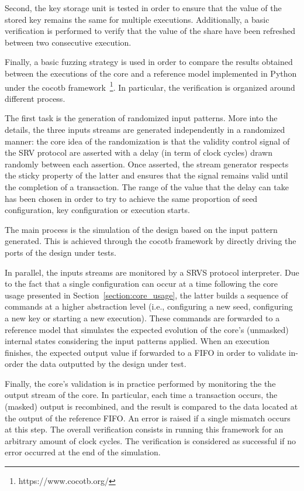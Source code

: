 \documentclass{scrartcl}
\begin{document}
Second, the key storage unit is tested in order to ensure that the value of the
stored key remains the same for multiple executions. Additionally, a basic
verification is performed to verify that the value of the share have been
refreshed between two consecutive execution. 

Finally, a basic fuzzing strategy is used in order to compare the results
obtained between the executions of the core and a reference model implemented in
Python under the cocotb framework~\footnote{https://www.cocotb.org/}.
In particular, the verification is organized around different process.  

The first task is the generation of randomized input patterns. More into the
details, the three inputs streams are generated independently in a randomized
manner: the core idea of the randomization is that the validity control signal
of the SRV protocol are asserted with a delay (in term of clock cycles) drawn
randomly between each assertion. Once asserted, the stream generator respects
the sticky property of the latter and ensures that the signal remains valid
until the completion of a transaction. The range of the value that the delay
can take has been chosen in order to try to achieve the same proportion of seed
configuration, key configuration or execution starts. 

The main process is the simulation of the design based on the input pattern
generated. This is achieved through the cocotb framework by directly driving
the ports of the design under tests. 

In parallel, the inputs streams are monitored by a SRVS protocol interpreter.
Due to the fact that a single configuration can occur at a time following the
core usage presented in Section~\ref{section:core_usage}, the latter builds a
sequence of commands at a higher abstraction level (i.e., configuring a new
seed, configuring a new key or starting a new execution). These commands are
forwarded to a reference model that simulates the expected evolution of the
core's (unmasked) internal states considering the input patterns applied.  When
an execution finishes, the expected output value if forwarded to a FIFO in
order to validate in-order the data outputted by the design under test.

Finally, the core's validation is in practice performed by monitoring the
the output stream of the core. In particular, each time a transaction occurs,
the (masked) output is recombined, and the result is compared to the data
located at the output of the reference FIFO. An error is raised if a single
mismatch occurs at this step. The overall verification consists in running this
framework for an arbitrary amount of clock cycles.  The verification is
considered as successful if no error occurred at the end of the simulation. 
\end{document}

